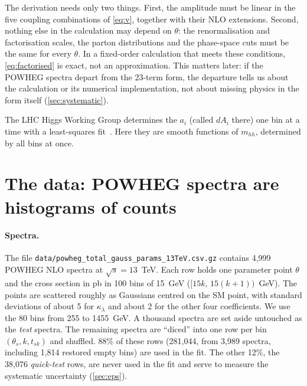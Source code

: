 \documentclass[11pt]{article}
\newcommand{\file}[1]{\nolinkurl{#1}}
\newcommand{\mhh}{m_{hh}}
\newcommand{\kl}{\kappa_\lambda}
\begin{document}
\begin{assume}
The derivation needs only two things. First, the amplitude must be linear in the five
coupling combinations of \cref{eq:v}, together with their NLO extensions. Second, nothing
else in the calculation may depend on $\theta$: the renormalisation and factorisation
scales, the parton distributions and the phase-space cuts must be the same for every
$\theta$. In a fixed-order calculation that meets these conditions, \cref{eq:factorised} is
exact, not an approximation. This matters later: if the POWHEG spectra depart from the
23-term form, the departure tells us about the calculation or its numerical implementation,
not about missing physics in the form itself (\cref{sec:systematic}).
\end{assume}

The LHC Higgs Working Group determines the $a_i$ (called $dA_i$ there) one bin at a time with
a least-squares fit~\cite{alasfar}. Here they are smooth functions of $\mhh$, determined by
all bins at once.

\section{The data: POWHEG spectra are histograms of counts}
\label{sec:data}

\paragraph{Spectra.} The file \file{data/powheg_total_gauss_params_13TeV.csv.gz} contains
4,999 POWHEG NLO spectra at $\sqrt{s}=13$~TeV. Each row holds one parameter point $\theta$
and the cross section in pb in 100 bins of 15~GeV ($[15k,\,15(k+1))$~GeV). The points are
scattered roughly as Gaussians centred on the SM point, with standard deviations of about 5
for $\kl$ and about 2 for the other four coefficients. We use the 80 bins from 255 to
1455~GeV. A thousand spectra are set aside untouched as the \emph{test} spectra. The
remaining spectra are ``diced'' into one row per bin $(\theta_s, k, t_{sk})$ and shuffled.
88\% of these rows (281,044, from 3,989 spectra, including 1,814 restored empty bins) are used
in the fit. The other 12\%, the 38,076 \emph{quick-test} rows, are never used in the fit and
serve to measure the systematic uncertainty (\cref{sec:eps}).
\end{document}
